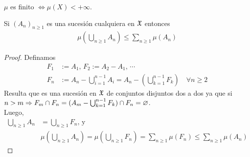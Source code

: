\begin{corollary}
    \(\mu\) es finito \(\iff \mu(X) < +\infty\).
\end{corollary}

\begin{lemma}
    Si \((A_n)_{n \geq 1}\) es una sucesión cualquiera en \(\mathfrak{X}\) entonces \begin{align*}
        \mu(\bigcup_{n \geq 1} A_n) \leq \sum_{n \geq 1} \mu(A_n)
    \end{align*}
    \begin{proof}
        Definamos \begin{align*}
            F_1 & := A_1 \text{, } F_2 := A_2 - A_1\text{, } \cdots                                                        \\
            F_n & := A_n - \bigcup_{i = 1}^{n-1} A_i = A_n - ( \bigcup_{k = 1}^{n-1} F_k ) \quad \forall n \geq 2
        \end{align*}
        Resulta que es una sucesión en \(\mathfrak{X}\) de conjuntos disjuntos dos a dos ya que si \(n > m \Rightarrow F_m \cap F_n = (A_m - \bigcup_{k = 1}^{n-1} F_k) \cap F_n = \varnothing\). \\
        Luego, \begin{align*}
            \bigcup_{n \geq 1} A_n & = \bigcup_{n \geq 1} F_n \text{, y }                                                                               \\
                                   & \mu(\bigcup_{n \geq 1} A_n) = \mu(\bigcup_{n \geq 1} F_n) = \sum_{n \geq 1} \mu(F_n) \leq \sum_{n \geq 1} \mu(A_n)
        \end{align*}
    \end{proof}
\end{lemma}

\clearpage

